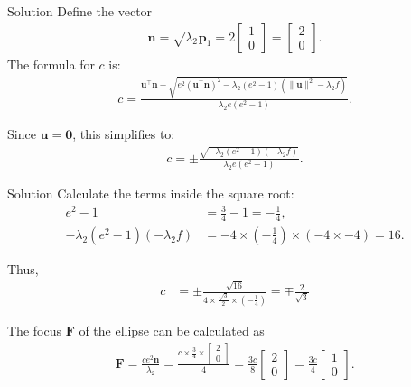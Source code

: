 \documentclass{beamer}
\begin{document}
\begin{frame}{Solution}
Define the vector
\begin{align}
\mathbf{n} = \sqrt{\lambda_2} \mathbf{p}_1 = 2 \begin{bmatrix} 1 \\ 0 \end{bmatrix} = \begin{bmatrix} 2 \\ 0 \end{bmatrix}.
\end{align}
The formula for $c$ is:
\begin{align}
c = \frac{ \mathbf{u}^\top \mathbf{n} \pm \sqrt{ e^2 (\mathbf{u}^\top \mathbf{n})^2 - \lambda_2 (e^2 - 1)( \|\mathbf{u}\|^2 - \lambda_2 f ) } }{ \lambda_2 e (e^2 - 1) }.
\end{align}

Since $\mathbf{u} = \mathbf{0}$, this simplifies to:
\begin{align}
c = \pm \frac{ \sqrt{ - \lambda_2 (e^2 - 1)( - \lambda_2 f ) } }{ \lambda_2 e (e^2 - 1) }.
\end{align}

\end{frame}

\begin{frame}{Solution}
Calculate the terms inside the square root:
\begin{align}
e^2 - 1 &= \frac{3}{4} - 1 = -\frac{1}{4}, \\
- \lambda_2 (e^2 - 1)( - \lambda_2 f ) &= -4 \times \left(-\frac{1}{4}\right) \times (-4 \times -4) = 16.
\end{align}

Thus,
\begin{align}
c &= \pm \frac{\sqrt{16}}{4 \times \frac{\sqrt{3}}{2} \times \left(-\frac{1}{4}\right)} = \mp \frac{2}{\sqrt{3}}
\end{align}


The focus $\mathbf{F}$ of the ellipse can be calculated as
\begin{align}
\mathbf{F} = \frac{c e^2 \mathbf{n}}{\lambda_2} = \frac{c \times \frac{3}{4} \times \begin{bmatrix} 2 \\ 0 \end{bmatrix}}{4} = \frac{3c}{8} \begin{bmatrix} 2 \\ 0 \end{bmatrix} = \frac{3c}{4} \begin{bmatrix} 1 \\ 0 \end{bmatrix}.
\end{align}
\end{frame}
\end{document}
